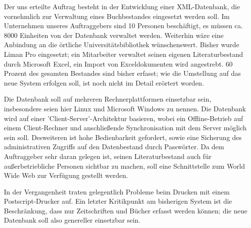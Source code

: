 
Der uns erteilte Auftrag besteht in der Entwicklung einer XML-Datenbank, die vornehmlich zur 
Verwaltung eines Buchbestandes
eingesetzt werden soll. Im Unternehmen unseres Auftraggebers sind 10 Personen besch\"aftigt, es m\"ussen ca. 8000
Einheiten von der Datenbank verwaltet werden. Weiterhin w\"are eine Anbindung an die \"ortliche Universit\"atsbibliothek
w\"unschenswert. Bisher wurde Liman Pro eingesetzt; ein Mitarbeiter verwaltet seinen eigenen Literaturbestand durch Microsoft
Excel, ein Import von Exceldokumenten wird angestrebt. 60 Prozent des gesamten Bestandes sind bisher erfasst; wie die 
Umstellung auf das neue System erfolgen soll, ist noch nicht im Detail er\"ortert worden. 

Die Datenbank soll auf mehreren Rechnerplattformen einsetzbar sein, insbesondere seien hier Linux und 
Microsoft Windows
zu nennen. Die Datenbank wird auf einer 'Client-Server'-Architektur basieren, wobei 
ein Offline-Betrieb auf einem 
Client-Rechner und anschlie{\ss}ende Synchronisation mit dem Server m\"oglich sein soll. Desweiteren 
ist hohe Bedienbarkeit
gefordert, sowie eine Sicherung des administrativen Zugriffs auf den Datenbestand durch Passw\"orter. Da dem 
Auftraggeber
sehr daran gelegen ist, seinen Literaturbestand auch f\"ur au{\ss}erbetriebliche Personen sichtbar zu machen, soll eine
Schnittstelle zum World Wide Web  zur Verf\"ugung gestellt werden.

In der Vergangenheit traten gelegentlich Probleme beim Drucken mit einem  Postscript-Drucker 
 auf. Ein letzter Kritikpunkt
am bisherigen System ist die Beschr\"ankung, dass nur Zeitschriften  und B\"ucher  erfasst werden 
k\"onnen; die neue Datenbank soll also genereller einsetzbar sein.
